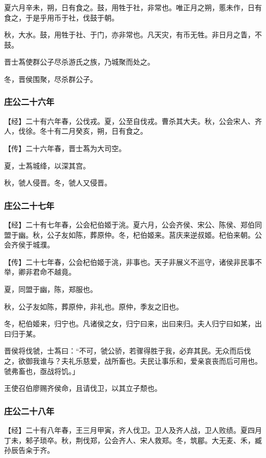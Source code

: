 \documentclass[]{article}
\begin{document}
夏六月辛未，朔，日有食之。鼓，用牲于社，非常也。唯正月之朔，慝未作，日有食之，于是乎用币于社，伐鼓于朝。

秋，大水。鼓，用牲于社、于门，亦非常也。凡天灾，有币无牲。非日月之眚，不鼓。

晋士蒍使群公子尽杀游氏之族，乃城聚而处之。

冬，晋侯围聚，尽杀群公子。

\hypertarget{header-n550}{%
\subsubsection{庄公二十六年}\label{header-n550}}

【经】二十有六年春，公伐戎。夏，公至自伐戎。曹杀其大夫。秋，公会宋人、齐人，伐徐。冬十有二月癸亥，朔，日有食之。

【传】二十六年春，晋士蒍为大司空。

夏，士蒍城绛，以深其宫。

秋，虢人侵晋。冬，虢人又侵晋。

\hypertarget{header-n557}{%
\subsubsection{庄公二十七年}\label{header-n557}}

【经】二十有七年春，公会杞伯姬于洮。夏六月，公会齐侯、宋公、陈侯、郑伯同盟于幽。秋，公子友如陈，葬原仲。冬，杞伯姬来。莒庆来逆叔姬。杞伯来朝。公会齐侯于城濮。

【传】二十七年春，公会杞伯姬于洮，非事也。天子非展义不巡守，诸侯非民事不举，卿非君命不越竟。

夏，同盟于幽，陈，郑服也。

秋，公子友如陈，葬原仲，非礼也。原仲，季友之旧也。

冬，杞伯姬来，归宁也。凡诸侯之女，归宁曰来，出曰来归。夫人归宁曰如某，出曰归于某。

晋侯将伐虢，士蒍曰：``不可，虢公骄，若骤得胜于我，必弃其民。无众而后伐之，欲御我谁与？夫礼乐慈爱，战所畜也。夫民让事乐和，爱亲哀丧而后可用也。虢弗畜也，亟战将饥。」

王使召伯廖赐齐侯命，且请伐卫，以其立子颓也。

\hypertarget{header-n567}{%
\subsubsection{庄公二十八年}\label{header-n567}}

【经】二十有八年春，王三月甲寅，齐人伐卫。卫人及齐人战，卫人败绩。夏四月丁未，邾子琐卒。秋，荆伐郑，公会齐人、宋人救郑。冬，筑郿。大无麦、禾，臧孙辰告籴于齐。
\end{document}
